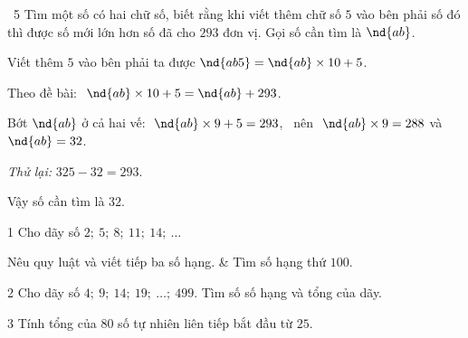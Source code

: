 \gap
\begin{exbox}{\ExWord\ 5}
Tìm một số có hai chữ số, biết rằng khi viết thêm chữ số $5$ vào bên phải số đó thì được số mới lớn hơn số đã cho $293$ đơn vị.
\guide
Gọi số cần tìm là $\nd{ab}$.\par Viết thêm $5$ vào bên phải ta được $\nd{ab5}=\nd{ab}\times10+5$.\par
Theo đề bài: $\ \nd{ab}\times10+5=\nd{ab}+293$.\par
Bớt $\nd{ab}$ ở cả hai vế: $\ \nd{ab}\times9+5=293$, \ nên $\ \nd{ab}\times9=288$ và $\nd{ab}=32$.\par
\emph{Thử lại:} $325-32=293$.\par Vậy số cần tìm là $32$.
\end{exbox}
\begin{probbox}{1}{\relax}
Cho dãy số $2;\ 5;\ 8;\ 11;\ 14;\ \dots$
\begin{cols2}
 Nêu quy luật và viết tiếp ba số hạng. &  Tìm số hạng thứ $100$.\\
\end{cols2}
\end{probbox}
\gap
\begin{probbox}{2}{\relax}
Cho dãy số $4;\ 9;\ 14;\ 19;\ \dots;\ 499$. Tìm số số hạng và tổng của dãy.
\end{probbox}
\gap
\begin{probbox}{3}{\relax}
Tính tổng của $80$ số tự nhiên liên tiếp bắt đầu từ $25$.
\end{probbox}
